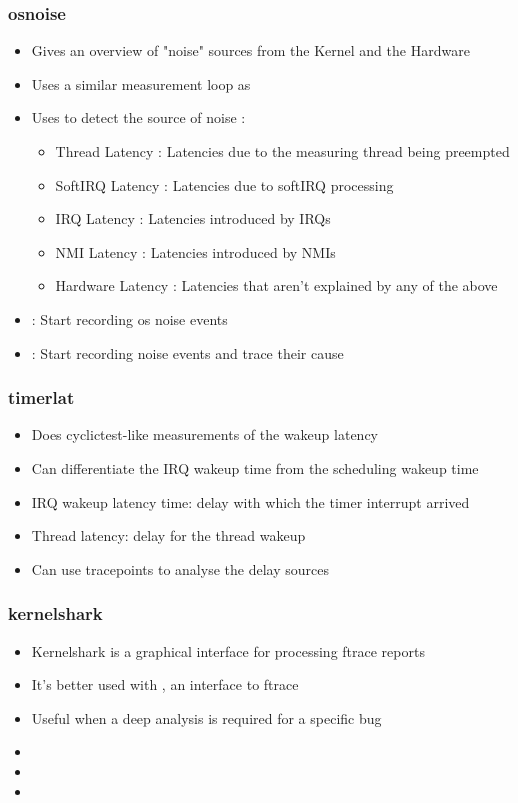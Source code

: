 \begin{frame}
	\frametitle{osnoise}
	\begin{itemize}
		\item Gives an overview of "noise" sources from the Kernel and the Hardware
		\item Uses a similar measurement loop as 
		\item Uses  to detect the source of noise :
			\begin{itemize}
				\item Thread Latency : Latencies due to the measuring thread being preempted
				\item SoftIRQ Latency : Latencies due to softIRQ processing
				\item IRQ Latency : Latencies introduced by IRQs
				\item NMI Latency : Latencies introduced by NMIs
				\item Hardware Latency : Latencies that aren't explained by any of the above
			\end{itemize}
		\item {} : Start recording os noise events
		\item {} : Start recording noise events and trace their cause
	\end{itemize}
\end{frame}

\begin{frame}
	\frametitle{timerlat}
	\begin{itemize}
		\item Does cyclictest-like measurements of the wakeup latency
		\item Can differentiate the IRQ wakeup time from the scheduling wakeup time
		\item IRQ wakeup latency time: delay with which the timer interrupt arrived
		\item Thread latency: delay for the thread wakeup
		\item Can use  tracepoints to analyse the delay sources
	\end{itemize}
\end{frame}

\begin{frame}
	\frametitle{kernelshark}
	\begin{itemize}
		\item Kernelshark is a graphical interface for processing ftrace reports
		\item It's better used with , an interface to ftrace
		\item Useful when a deep analysis is required for a specific bug 
		\item {}
		\item {}
		\item {}
	\end{itemize}
\end{frame}

